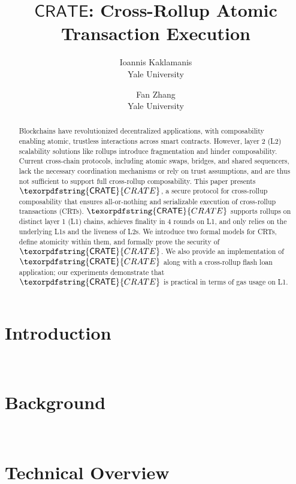 \documentclass[letterpaper,twocolumn,10pt]{article}
\newcommand{\pname}{\texorpdfstring{\ensuremath{\mathsf{CRATE}}}{CRATE}}
\begin{document}


\date{}

\title{\Large \bf \pname: Cross-Rollup Atomic Transaction Execution}

\author{
{\rm Ioannis Kaklamanis}\\
Yale University
\and
{\rm Fan Zhang}\\
Yale University
} %

\maketitle

\begin{abstract}
Blockchains have revolutionized decentralized applications, with composability enabling atomic, trustless interactions across smart contracts. However, layer 2 (L2) scalability solutions like rollups introduce fragmentation and hinder composability.
Current cross-chain protocols, including atomic swaps, bridges, and shared sequencers, lack the necessary coordination mechanisms or rely on trust assumptions, and are thus not sufficient to support full cross-rollup composability.
This paper presents $\pname$, a secure protocol for cross-rollup composability that ensures all-or-nothing and serializable execution of cross-rollup transactions (CRTs).
 $\pname$ supports rollups on distinct layer 1 (L1) chains, achieves finality in 4 rounds on L1, and only relies on the underlying L1s and the liveness of L2s. We introduce two formal models for CRTs, define atomicity within them, and formally prove the security of $\pname$. We also provide an implementation of $\pname$ along with a cross-rollup flash loan application; our experiments demonstrate that $\pname$ is practical in terms of gas usage on L1.
\end{abstract}

\section{Introduction}~\label{sec:intro}


\section{Background}~\label{sec:background}


\section{Technical Overview}~\label{sec:overview}

\end{document}
